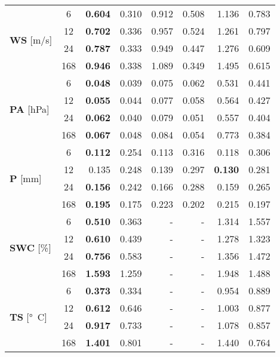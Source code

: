 \begin{table}
\begin{tabular}{p{2.1cm}c|rr|rr|rr}
\cline{1-8}
\multirow[c]{4}{*}{\parbox{2.1cm}{\textbf{WS} [\si{m/s}]}} & 6 & \bfseries 0.604 & 0.310 & 0.912 & 0.508 & 1.136 & 0.783 \\
 & 12 & \bfseries 0.702 & 0.336 & 0.957 & 0.524 & 1.261 & 0.797 \\
 & 24 & \bfseries 0.787 & 0.333 & 0.949 & 0.447 & 1.276 & 0.609 \\
 & 168 & \bfseries 0.946 & 0.338 & 1.089 & 0.349 & 1.495 & 0.615 \\
\cline{1-8}
\multirow[c]{4}{*}{\parbox{2.1cm}{\textbf{PA} [\si{hPa}]}} & 6 & \bfseries 0.048 & 0.039 & 0.075 & 0.062 & 0.531 & 0.441 \\
 & 12 & \bfseries 0.055 & 0.044 & 0.077 & 0.058 & 0.564 & 0.427 \\
 & 24 & \bfseries 0.062 & 0.040 & 0.079 & 0.051 & 0.557 & 0.404 \\
 & 168 & \bfseries 0.067 & 0.048 & 0.084 & 0.054 & 0.773 & 0.384 \\
\cline{1-8}
\multirow[c]{4}{*}{\parbox{2.1cm}{\textbf{P} [\si{mm}]}} & 6 & \bfseries 0.112 & 0.254 & 0.113 & 0.316 & 0.118 & 0.306 \\
 & 12 & 0.135 & 0.248 & 0.139 & 0.297 & \bfseries 0.130 & 0.281 \\
 & 24 & \bfseries 0.156 & 0.242 & 0.166 & 0.288 & 0.159 & 0.265 \\
 & 168 & \bfseries 0.195 & 0.175 & 0.223 & 0.202 & 0.215 & 0.197 \\
\cline{1-8}
\multirow[c]{4}{*}{\parbox{2.1cm}{\textbf{SWC} [\si{\%}]}} & 6 & \bfseries 0.510 & 0.363 & - & - & 1.314 & 1.557 \\
 & 12 & \bfseries 0.610 & 0.439 & - & - & 1.278 & 1.323 \\
 & 24 & \bfseries 0.756 & 0.583 & - & - & 1.356 & 1.472 \\
 & 168 & \bfseries 1.593 & 1.259 & - & - & 1.948 & 1.488 \\
\cline{1-8}
\multirow[c]{4}{*}{\parbox{2.1cm}{\textbf{TS} [\si{°C}]}} & 6 & \bfseries 0.373 & 0.334 & - & - & 0.954 & 0.889 \\
 & 12 & \bfseries 0.612 & 0.646 & - & - & 1.003 & 0.877 \\
 & 24 & \bfseries 0.917 & 0.733 & - & - & 1.078 & 0.857 \\
 & 168 & \bfseries 1.401 & 0.801 & - & - & 1.440 & 0.764 \\
\cline{1-8}
\bottomrule
\end{tabular}
\end{table}
